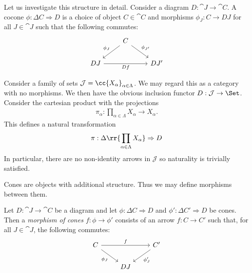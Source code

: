 \documentclass{article}
\begin{document}
Let us investigate this structure in detail. Consider a diagram
$D:\cat{J}\to\cat{C}$. A cocone $\phi:\Delta C\Rightarrow D$ is a choice of
object $C\in\cat{C}$ and morphisms $\phi_J:C\to DJ$ for all $J\in\cat{J}$ such
that the following commutes:
\begin{equation}
  \begin{tikzcd}
  & C \\
    DJ && {DJ'}
    \arrow["Df"', from=2-1, to=2-3]
    \arrow["{\phi_{J'}}", from=1-2, to=2-3]
    \arrow["{\phi_J}"', from=1-2, to=2-1]
  \end{tikzcd}
\end{equation}

\begin{example}
  Consider a family of sets $\mathcal J=\cc{X_\alpha}_{\alpha\in\Lambda}$. We may
  regard this as a category with no morphisms. We then have
  the obvious inclusion functor $D:\mathcal J\to\Set$. Consider the cartesian
  product with the projections
  \begin{align*}
    \pi_\alpha : \prod_{\alpha\in\Lambda} X_\alpha \to X_\alpha.
  \end{align*}
  This defines a natural transformation
  \begin{align*}
    \pi : \Delta\rr{\prod_{\alpha\in\Lambda} X_\alpha}\Rightarrow D
  \end{align*}
  In particular, there are no non-identity arrows in $\mathcal J$ so
  naturality is trivially satisfied.
\end{example}

Cones are objects with additional structure. Thus we may define morphisms
between them.

\begin{definition}
  Let $D:\cat{J}\to\cat{C}$ be a diagram and let $\phi:\Delta C\Rightarrow D$
  and $\phi':\Delta C'\Rightarrow D$ be cones. Then a \emph{morphism of cones
  $f:\phi\to \phi'$} consists of an arrow $f:C\to C'$ such that, for all
  $J\in\cat{J}$, the following commutes:
  \begin{equation}
    \begin{tikzcd}
      C && {C'} \\
        & DJ
        \arrow["f", from=1-1, to=1-3]
        \arrow["{\phi_J'}", from=1-3, to=2-2]
        \arrow["{\phi_J}"', from=1-1, to=2-2]
    \end{tikzcd}
  \end{equation}
\end{definition}
\end{document}
